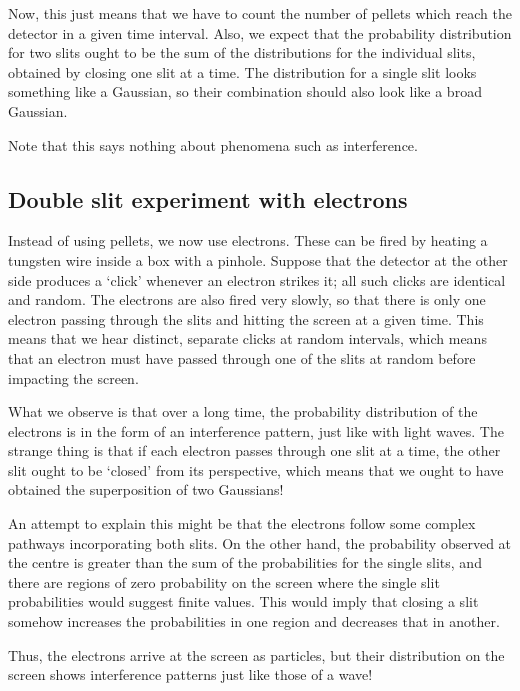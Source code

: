 \documentclass[11pt]{article}
\theoremstyle{definition}
\theoremstyle{remark}
\numberwithin{equation}{section}
\begin{document}
    Now, this just means that we have to count the number of pellets which reach the
    detector in a given time interval. Also, we expect that the probability
    distribution for two slits ought to be the sum of the distributions for the
    individual slits, obtained by closing one slit at a time. The distribution for a
    single slit looks something like a Gaussian, so their combination should also
    look like a broad Gaussian.

    Note that this says nothing about phenomena such as interference.

    \subsection{Double slit experiment with electrons}
    Instead of using pellets, we now use electrons. These can be fired by heating
    a tungsten wire inside a box with a pinhole. Suppose that the detector at the
    other side produces a `click' whenever an electron strikes it; all such clicks
    are identical and random. The electrons are also fired very slowly, so that
    there is only one electron passing through the slits and hitting the screen at a
    given time. This means that we hear distinct, separate clicks at random
    intervals, which means that an electron must have passed through one of the
    slits at random before impacting the screen.

    What we observe is that over a long time, the probability distribution of the
    electrons is in the form of an interference pattern, just like with light waves.
    The strange thing is that if each electron passes through one slit at a time,
    the other slit ought to be `closed' from its perspective, which means that we
    ought to have obtained the superposition of two Gaussians!
    
    An attempt to explain this might be that the electrons follow some complex
    pathways incorporating both slits. On the other hand, the probability observed
    at the centre is greater than the sum of the probabilities for the single slits,
    and there are regions of zero probability on the screen where the single slit
    probabilities would suggest finite values. This would imply that closing a slit
    somehow increases the probabilities in one region and decreases that in another.

    Thus, the electrons arrive at the screen as particles, but their distribution on
    the screen shows interference patterns just like those of a wave!
\end{document}
